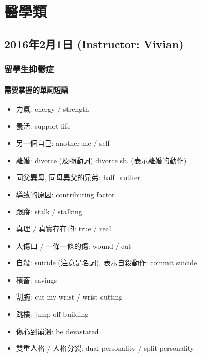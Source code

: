 \chapter{醫學類}
\section{2016年2月1日 (Instructor: Vivian)}
\subsection{留學生抑鬱症}
\subsubsection*{需要掌握的單詞短語}
\begin{multicols}{2}
\begin{itemize}
  \itemsep0em
  \item 力氣: energy / strength
  \item 養活: support life
  \item 另一個自己: another me / self
  \item 離婚: divorce (及物動詞) divorce sb. (表示離婚的動作)
  \item 同父異母, 同母異父的兄弟: half brother
  \item 導致的原因: contributing factor
  \item 跟蹤: stalk / stalking
  \item 真理 / 真實存在的: true / real
  \item 大傷口 / 一條一條的傷: wound / cut
  \item 自殺: suicide (注意是名詞), 表示自殺動作: commit suicide
  \item 積蓄: savings
  \item 割腕: cut my wrist / wrist cutting
  \item 跳樓: jump off  building
  \item 傷心到崩潰: be devastated
  \item 雙重人格 / 人格分裂: dual personality / split personality
\end{itemize}
\end{multicols}

